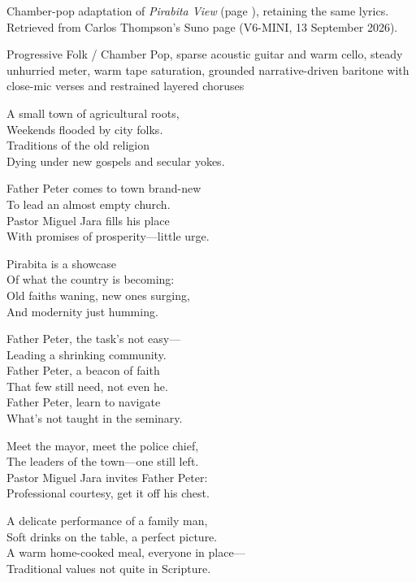 
\begin{notes}
Chamber-pop adaptation of \emph{Pirabita View} (page \pageref{sec:pirabita-view}), retaining the same lyrics. Retrieved from Carlos Thompson's Suno page (V6-MINI, 13 September 2026).
\end{notes}
\begin{style}
Progressive Folk / Chamber Pop, sparse acoustic guitar and warm cello, steady unhurried meter, warm tape saturation, grounded narrative-driven baritone with close-mic verses and restrained layered choruses
\end{style}
\begin{lyrics}
A small town of agricultural roots,\\
Weekends flooded by city folks.\\
Traditions of the old religion\\
Dying under new gospels and secular yokes.

Father Peter comes to town brand-new\\
To lead an almost empty church.\\
Pastor Miguel Jara fills his place\\
With promises of prosperity—little urge.

Pirabita is a showcase\\
Of what the country is becoming:\\
Old faiths waning, new ones surging,\\
And modernity just humming.

Father Peter, the task's not easy—\\
Leading a shrinking community.\\
Father Peter, a beacon of faith\\
That few still need, not even he.\\
Father Peter, learn to navigate\\
What's not taught in the seminary.

Meet the mayor, meet the police chief,\\
The leaders of the town—one still left.\\
Pastor Miguel Jara invites Father Peter:\\
Professional courtesy, get it off his chest.

A delicate performance of a family man,\\
Soft drinks on the table, a perfect picture.\\
A warm home-cooked meal, everyone in place—\\
Traditional values not quite in Scripture.


\end{lyrics}
